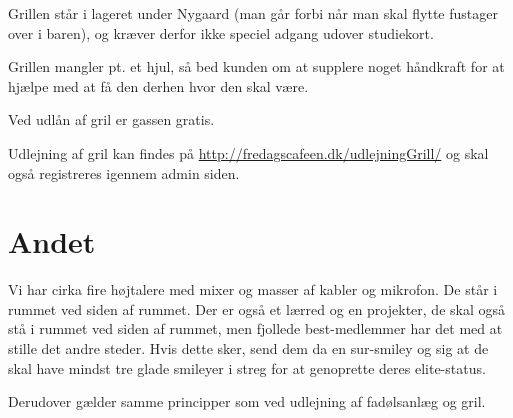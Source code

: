 Grillen står i lageret under Nygaard (man går forbi når man skal flytte fustager over i baren), og kræver derfor ikke speciel adgang udover studiekort.

Grillen mangler pt. et hjul, så bed kunden om at supplere noget håndkraft for at hjælpe med at få den derhen hvor den skal være.

Ved udlån af gril er gassen gratis.

Udlejning af gril kan findes på \url{http://fredagscafeen.dk/udlejningGrill/} og skal også registreres igennem admin siden.

\section{Andet}
Vi har cirka fire højtalere med mixer og masser af kabler og mikrofon. De står i rummet ved siden af rummet. Der er også et lærred og en projekter, de skal også stå i rummet ved siden af rummet, men fjollede best-medlemmer har det med at stille det andre steder. Hvis dette sker, send dem da en sur-smiley og sig at de skal have mindst tre glade smileyer i streg for at genoprette deres elite-status.

Derudover gælder samme principper som ved udlejning af fadølsanlæg og gril.



